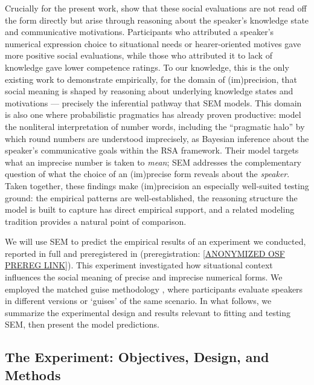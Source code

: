 \documentclass[12pt,a4paper]{article}
\begin{document}
Crucially for the present work, \citet{soltEtAl2025} show that these social
evaluations are not read off the form directly but arise through reasoning about
the speaker's knowledge state and communicative motivations. Participants who
attributed a speaker's numerical expression choice to situational needs or
hearer-oriented motives gave more positive social evaluations, while those who
attributed it to lack of knowledge gave lower competence ratings. To our
knowledge, this is the only existing work to demonstrate empirically, for the
domain of (im)precision, that social meaning is shaped by reasoning about
underlying knowledge states and motivations --- precisely the inferential pathway
that SEM models. This domain is also one where probabilistic pragmatics has
already proven productive: \citet{kao2014} model the nonliteral interpretation of
number words, including the ``pragmatic halo'' by which round numbers are
understood imprecisely, as Bayesian inference about the speaker's communicative
goals within the RSA framework. Their model targets what an imprecise number is
taken to \emph{mean}; SEM addresses the complementary question of what the
choice of an (im)precise form reveals about the \emph{speaker}. Taken together,
these findings make (im)precision an especially well-suited testing ground: the
empirical patterns are well-established, the reasoning structure the model is
built to capture has direct empirical support, and a related modeling tradition
provides a natural point of comparison.

We will use SEM to predict the empirical results of an experiment we conducted,
reported in full and preregistered in \citet{soltEtAl2025} (preregistration:
\url{[ANONYMIZED OSF PREREG LINK]}). This experiment investigated how
situational context influences the social meaning of
precise and imprecise numerical forms. We employed the matched guise methodology
\citep{campbellkibler2007}, where participants evaluate speakers in different
versions or `guises' of the same scenario. In what follows, we summarize the
experimental design and results relevant to fitting and testing SEM, then present
the model predictions.




\subsection{The Experiment: Objectives, Design, and Methods}
\end{document}
